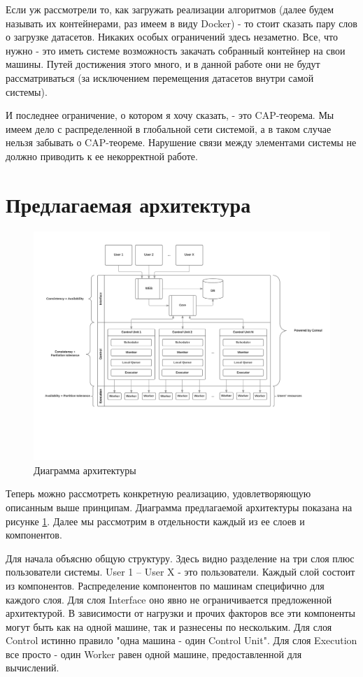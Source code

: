 Если уж рассмотрели то, как загружать реализации алгоритмов (далее будем называть их контейнерами, раз имеем в виду Docker) - то стоит сказать пару слов о загрузке датасетов. Никаких особых ограничений здесь незаметно. Все, что нужно - это иметь системе возможность закачать собранный контейнер на свои машины. Путей достижения этого много, и в данной работе они не будут рассматриваться (за исключением перемещения датасетов внутри самой системы).

И последнее ограничение, о котором я хочу сказать, - это CAP-теорема. Мы имеем дело с распределенной в глобальной сети системой, а в таком случае нельзя забывать о CAP-теореме. Нарушение связи между элементами системы не должно приводить к ее некорректной работе.

\pagebreak

\section{Предлагаемая архитектура}

\begin{figure}
	\centering
	\includegraphics[width=\textwidth]{fig/architecture}
	\caption{Диаграмма архитектуры}\label{fig:architecture}
\end{figure}

Теперь можно рассмотреть конкретную реализацию, удовлетворяющую описанным выше принципам. Диаграмма предлагаемой архитектуры показана на рисунке \ref{fig:architecture}. Далее мы рассмотрим в отдельности каждый из ее слоев и компонентов.

Для начала объясню общую структуру. Здесь видно разделение на три слоя плюс пользователи системы. User 1 -- User X - это пользователи. Каждый слой состоит из компонентов. Распределение компонентов по машинам специфично для каждого слоя. Для слоя Interface оно явно не ограничивается предложенной архитектурой. В зависимости от нагрузки и прочих факторов все эти компоненты могут быть как на одной машине, так и разнесены по нескольким. Для слоя Control истинно правило "одна машина - один Control Unit". Для слоя Execution все просто - один Worker равен одной машине, предоставленной для вычислений.

